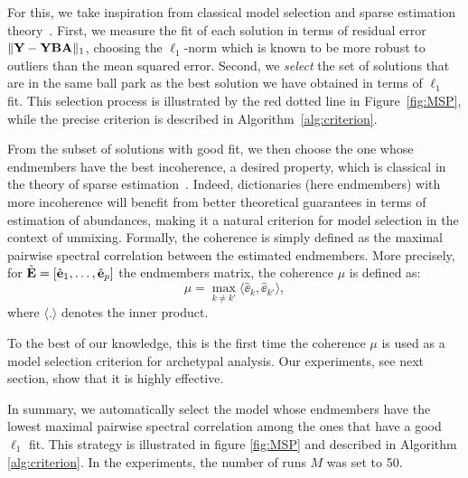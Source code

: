 For this, we take inspiration from classical model selection and sparse estimation theory~\cite{hastie_elements_2009}. First, we measure the fit of each solution in terms of residual error $\|\mathbf Y - \mathbf Y\mathbf B\mathbf A\|_1$, choosing the $\ell_1$-norm which is known to be more robust to outliers than the mean squared error. 
Second, we \emph{select} the set of solutions that are in the same ball park as the best solution we have obtained in terms of $\ell_1$ fit.
This selection process is illustrated by the red dotted line in Figure~\ref{fig:MSP}, while the precise criterion is described in Algorithm~\ref{alg:criterion}.

From the subset of solutions with good fit, we then choose the one whose endmembers have the best incoherence, a desired property, which is classical in the theory of sparse estimation~\cite{elad_generalized_2002, gribonval_sparse_2003, mairal_sparse_2014}. 
Indeed, dictionaries (here endmembers) with more incoherence will benefit from better theoretical guarantees in terms of estimation of abundances, making it a natural criterion for model selection in the context of unmixing.
Formally, the coherence is simply defined as the maximal pairwise spectral correlation between the estimated endmembers.
More precisely, for $\hat{\mathbf E} = [\hat{\mathbf e}_1, \ldots, \hat{\mathbf e}_p]$ the endmembers matrix, the coherence $\mu$ is defined as:
\begin{equation} \label{eq:coherence}
\mu = \max_{k \neq k'}\langle \hat{\ee}_k, \hat{\ee}_{k'} \rangle,
\end{equation}
where $\langle . \rangle$ denotes the inner product.

To the best of our knowledge, this is the first time the coherence $\mu$ is used as a model selection criterion for archetypal analysis. 
Our experiments, see next section, show that it is highly effective.

In summary, we automatically select the model whose endmembers have the lowest maximal pairwise spectral correlation among the ones that have a good $\ell_1$ fit.
This strategy is illustrated in figure \ref{fig:MSP} and described in Algorithm \ref{alg:criterion}.
In the experiments, the number of runs $M$ was set to 50.

